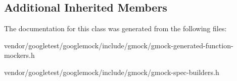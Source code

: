 \subsection*{Additional Inherited Members}


The documentation for this class was generated from the following files\+:\begin{DoxyCompactItemize}
\item 
vendor/googletest/googlemock/include/gmock/gmock-\/generated-\/function-\/mockers.\+h\item 
vendor/googletest/googlemock/include/gmock/gmock-\/spec-\/builders.\+h\end{DoxyCompactItemize}
